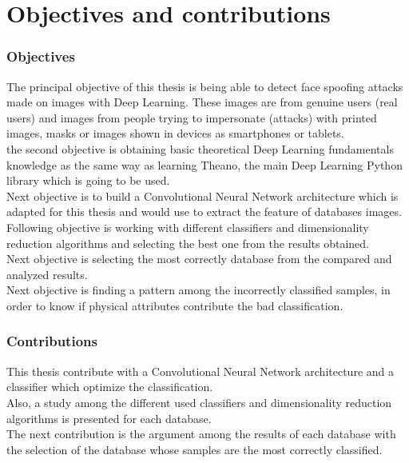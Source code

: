 \section{Objectives and contributions}
\subsubsection{Objectives}
The principal objective of this thesis is being able to detect face spoofing attacks made on images with Deep Learning. These images are from genuine users (real users) and images from people trying to impersonate (attacks) with printed images, masks or images shown in devices as smartphones or tablets.\\

the second objective is obtaining basic theoretical Deep Learning fundamentals knowledge as the same way as learning Theano, the main Deep Learning Python library which is going to be used.\\

Next objective is to build a Convolutional Neural Network architecture which is adapted for this thesis and would use to extract the feature of databases images.\\

Following objective is working with different classifiers and dimensionality reduction algorithms and selecting the best one from the results obtained.\\

Next objective is selecting the most correctly database from the compared and analyzed results.\\

Next objective is finding a pattern among the incorrectly classified samples, in order to know if physical attributes contribute the bad classification.\\

\subsubsection{Contributions}
This thesis contribute with a Convolutional Neural Network architecture and a classifier which optimize the classification.\\

Also, a study among the different used classifiers and dimensionality reduction algorithms is presented for each database.\\

The next contribution is the argument among the results of each database with the selection of the database whose samples are the most correctly classified.\\

